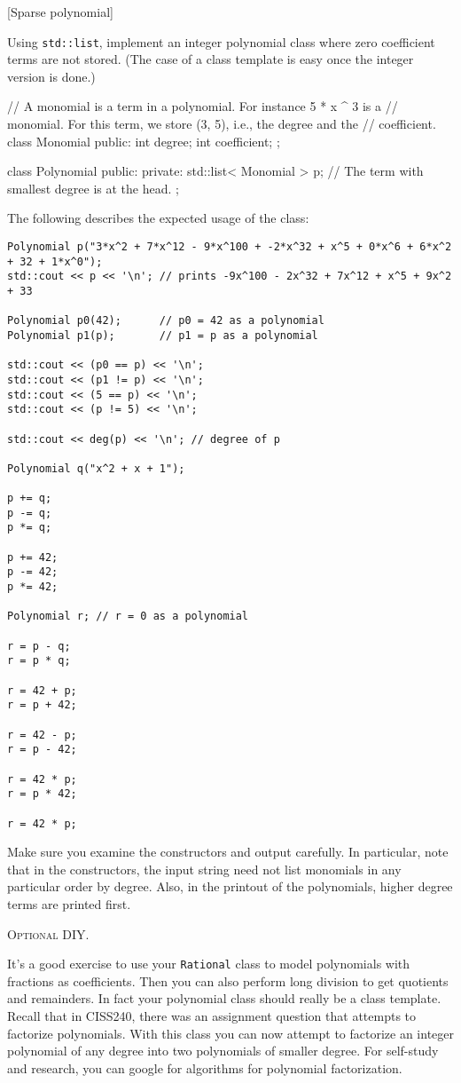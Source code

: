 [Sparse polynomial]

Using \verb!std::list!, implement an integer polynomial class where
zero coefficient terms are not stored.
(The case of a class template is easy once the integer version is done.)
\begin{console}[fontsize=\footnotesize]
// A monomial is a term in a polynomial. For instance 5 * x ^ 3 is a
// monomial. For this term, we store (3, 5), i.e., the degree and the
// coefficient.
class Monomial
{
public:
    int degree;
    int coefficient;
};

class Polynomial
{
public:
private:
    std::list< Monomial > p; // The term with smallest degree is at the head.
};
\end{console}
The following describes the expected usage of the class:
\begin{Verbatim}[frame=single,fontsize=\footnotesize]
Polynomial p("3*x^2 + 7*x^12 - 9*x^100 + -2*x^32 + x^5 + 0*x^6 + 6*x^2 + 32 + 1*x^0");
std::cout << p << '\n'; // prints -9x^100 - 2x^32 + 7x^12 + x^5 + 9x^2 + 33

Polynomial p0(42);      // p0 = 42 as a polynomial
Polynomial p1(p);       // p1 = p as a polynomial

std::cout << (p0 == p) << '\n';
std::cout << (p1 != p) << '\n';
std::cout << (5 == p) << '\n';
std::cout << (p != 5) << '\n';

std::cout << deg(p) << '\n'; // degree of p

Polynomial q("x^2 + x + 1");

p += q;
p -= q;
p *= q;

p += 42;
p -= 42;
p *= 42;

Polynomial r; // r = 0 as a polynomial

r = p - q;
r = p * q;

r = 42 + p;
r = p + 42;

r = 42 - p;
r = p - 42;

r = 42 * p;
r = p * 42;

r = 42 * p;
\end{Verbatim}
Make sure you examine the constructors and output carefully.
In particular, note that in the constructors, the input string need not
list monomials in any particular order by degree.
Also, in the printout of the polynomials, higher degree terms are
printed first.

\textsc{Optional DIY.}
\begin{enumerate}[nosep]
\li It's a good exercise to use your \verb!Rational! class to model
polynomials with fractions as coefficients.
Then you can also perform long division to get quotients
and remainders.
In fact your polynomial class should really be a class template.
\li Recall that in CISS240, there was an assignment question
that attempts to factorize polynomials.
With this class you can now attempt to factorize
an integer polynomial of any degree into two polynomials
of smaller degree.
For self-study and research,
you can google for algorithms for polynomial factorization.
\end{enumerate}
